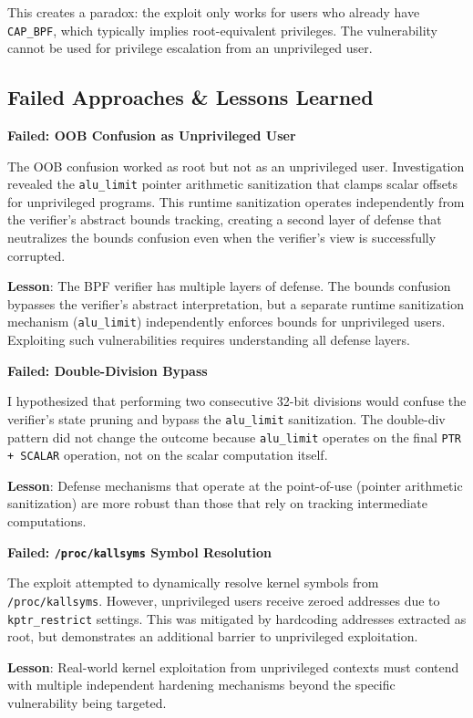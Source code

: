 This creates a paradox: the exploit only works for users who already have \texttt{CAP\_BPF}, which typically implies root-equivalent privileges. The vulnerability cannot be used for privilege escalation from an unprivileged user.




\subsection{Failed Approaches \& Lessons Learned}

\textbf{Failed: OOB Confusion as Unprivileged User}

The OOB confusion worked as root but not as an unprivileged user. Investigation revealed the \texttt{alu\_limit} pointer arithmetic sanitization that clamps scalar offsets for unprivileged programs. This runtime sanitization operates independently from the verifier's abstract bounds tracking, creating a second layer of defense that neutralizes the bounds confusion even when the verifier's view is successfully corrupted.

\textbf{Lesson}: The BPF verifier has multiple layers of defense. The bounds confusion bypasses the verifier's abstract interpretation, but a separate runtime sanitization mechanism (\texttt{alu\_limit}) independently enforces bounds for unprivileged users. Exploiting such vulnerabilities requires understanding all defense layers.

\textbf{Failed: Double-Division Bypass}

I hypothesized that performing two consecutive 32-bit divisions would confuse the verifier's state pruning and bypass the \texttt{alu\_limit} sanitization. The double-div pattern did not change the outcome because \texttt{alu\_limit} operates on the final \texttt{PTR + SCALAR} operation, not on the scalar computation itself.

\textbf{Lesson}: Defense mechanisms that operate at the point-of-use (pointer arithmetic sanitization) are more robust than those that rely on tracking intermediate computations.

\textbf{Failed: \texttt{/proc/kallsyms} Symbol Resolution}

The exploit attempted to dynamically resolve kernel symbols from \texttt{/proc/kallsyms}. However, unprivileged users receive zeroed addresses due to \texttt{kptr\_restrict} settings. This was mitigated by hardcoding addresses extracted as root, but demonstrates an additional barrier to unprivileged exploitation.

\textbf{Lesson}: Real-world kernel exploitation from unprivileged contexts must contend with multiple independent hardening mechanisms beyond the specific vulnerability being targeted.


